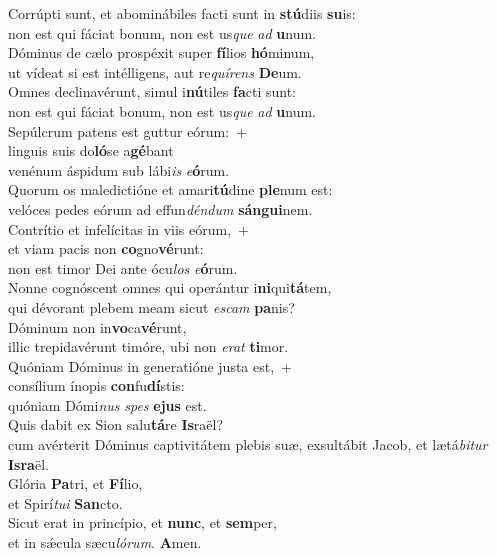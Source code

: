 \evenverse Corrúpti sunt, et abominábiles facti sunt in \textbf{stú}diis \textbf{su}is:~\*\\
\evenverse non est qui fáciat bonum, non est us\textit{que} \textit{ad} \textbf{u}num.\\
\oddverse Dóminus de cælo prospéxit super \textbf{fí}lios \textbf{hó}minum,~\*\\
\oddverse ut vídeat si est intélligens, aut re\textit{quí}\textit{rens} \textbf{De}um.\\
\evenverse Omnes declinavérunt, simul i\textbf{nú}tiles \textbf{fa}cti sunt:~\*\\
\evenverse non est qui fáciat bonum, non est us\textit{que} \textit{ad} \textbf{u}num.\\
\oddverse Sepúlcrum patens est guttur eórum:~+\\
\oddverse  linguis suis do\textbf{ló}se a\textbf{gé}bant~\*\\
\oddverse venénum áspidum sub lábi\textit{is} \textit{e}\textbf{ó}rum.\\
\evenverse Quorum os maledictióne et amari\textbf{tú}dine \textbf{ple}num est:~\*\\
\evenverse velóces pedes eórum ad effun\textit{dén}\textit{dum} \textbf{sán}\textbf{gui}nem.\\
\oddverse Contrítio et infelícitas in viis eórum,~+\\
\oddverse  et viam pacis non \textbf{co}gno\textbf{vé}runt:~\*\\
\oddverse non est timor Dei ante ócu\textit{los} \textit{e}\textbf{ó}rum.\\
\evenverse Nonne cognóscent omnes qui operántur i\textbf{ni}qui\textbf{tá}tem,~\*\\
\evenverse qui dévorant plebem meam sicut \textit{e}\textit{scam} \textbf{pa}nis?\\
\oddverse Dóminum non in\textbf{vo}ca\textbf{vé}runt,~\*\\
\oddverse illic trepidavérunt timóre, ubi non \textit{e}\textit{rat} \textbf{ti}mor.\\
\evenverse Quóniam Dóminus in generatióne justa est,~+\\
\evenverse  consílium ínopis \textbf{con}fu\textbf{dí}stis:~\*\\
\evenverse quóniam Dómi\textit{nus} \textit{spes} \textbf{e}\textbf{jus} est.\\
\oddverse Quis dabit ex Sion salu\textbf{tá}re \textbf{Is}raël?~\*\\
\oddverse cum avérterit Dóminus captivitátem plebis suæ, exsultábit Jacob, et lætá\textit{bi}\textit{tur} \textbf{Is}\textbf{ra}ël.\\
\evenverse Glória \textbf{Pa}tri, et \textbf{Fí}lio,~\*\\
\evenverse et Spirí\textit{tu}\textit{i} \textbf{San}cto.\\
\oddverse Sicut erat in princípio, et \textbf{nunc}, et \textbf{sem}per,~\*\\
\oddverse et in sǽcula sæcu\textit{ló}\textit{rum}. \textbf{A}men.\\
